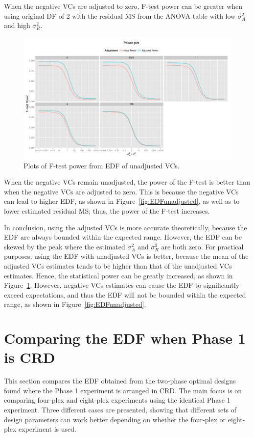 \documentclass[12pt,a4paper]{article}
\begin{document}
When the negative VCs are adjusted to zero, F-test power can be greater when using original DF of 2 with the residual MS from the ANOVA table with low $\sigma_A^2$ and high $\sigma_R^2$. 

\begin{figure}[ht]
\centering
\includegraphics[width=1 \textwidth]{Graph/remainNegPowerEDF.pdf}
\caption{Plots of F-test power from EDF of unadjusted VCs.}
\label{fig:PowerUnadjusted}
\end{figure}

When the negative VCs remain unadjusted, the power of the F-test is better than when the negative VCs are adjusted to zero. This is because the negative VCs can lead to higher EDF, as shown in Figure~\ref{fig:EDFunadjusted}, as well as to lower estimated residual MS; thus, the power of the F-test increases. 

In conclusion, using the adjusted VCs is more accurate theoretically, because the EDF are always bounded within the expected range. However, the EDF can be skewed by the peak where the estimated $\sigma_A^2$ and $\sigma_R^2$ are both zero. For practical purposes, using the EDF with unadjusted VCs is better, because the mean of the adjusted VCs estimates tends to be higher than that of the unadjusted VCs estimates. Hence, the statistical power can be greatly increased, as shown in Figure~\ref{fig:PowerUnadjusted}. However, negative VCs estimates can cause the EDF to significantly exceed expectations, and thus the EDF will not be bounded within the expected range, as shown in Figure~\ref{fig:EDFunadjusted}.
  
\section{Comparing the EDF when Phase 1 is CRD}
This section compares the EDF obtained from the two-phase optimal designs found where the Phase 1 experiment is arranged in CRD. The main focus is on comparing four-plex and eight-plex experiments using the identical Phase 1 experiment. Three different cases are presented, showing that different sets of design parameters can work better depending on whether the four-plex or eight-plex experiment is used.
\end{document}
